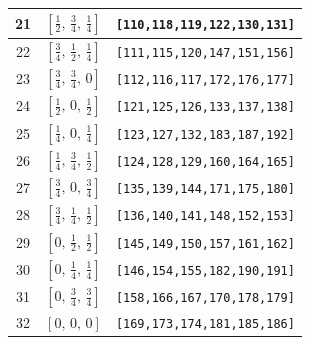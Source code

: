 \documentclass[fleqn,8pt]{jsarticle}
\begin{document}
\begin{longtable}{ccc}
21 & $\left[ \frac{1}{2},\, \frac{3}{4},\, \frac{1}{4} \right]$ & {\tt [110,118,119,122,130,131]} \\ \hline
22 & $\left[ \frac{3}{4},\, \frac{1}{2},\, \frac{1}{4} \right]$ & {\tt [111,115,120,147,151,156]} \\ \hline
23 & $\left[ \frac{3}{4},\, \frac{3}{4},\, 0 \right]$ & {\tt [112,116,117,172,176,177]} \\ \hline
24 & $\left[ \frac{1}{2},\, 0,\, \frac{1}{2} \right]$ & {\tt [121,125,126,133,137,138]} \\ \hline
25 & $\left[ \frac{1}{4},\, 0,\, \frac{1}{4} \right]$ & {\tt [123,127,132,183,187,192]} \\ \hline
26 & $\left[ \frac{1}{4},\, \frac{3}{4},\, \frac{1}{2} \right]$ & {\tt [124,128,129,160,164,165]} \\ \hline
27 & $\left[ \frac{3}{4},\, 0,\, \frac{3}{4} \right]$ & {\tt [135,139,144,171,175,180]} \\ \hline
28 & $\left[ \frac{3}{4},\, \frac{1}{4},\, \frac{1}{2} \right]$ & {\tt [136,140,141,148,152,153]} \\ \hline
29 & $\left[ 0,\, \frac{1}{2},\, \frac{1}{2} \right]$ & {\tt [145,149,150,157,161,162]} \\ \hline
30 & $\left[ 0,\, \frac{1}{4},\, \frac{1}{4} \right]$ & {\tt [146,154,155,182,190,191]} \\ \hline
31 & $\left[ 0,\, \frac{3}{4},\, \frac{3}{4} \right]$ & {\tt [158,166,167,170,178,179]} \\ \hline
32 & $\left[ 0,\, 0,\, 0 \right]$ & {\tt [169,173,174,181,185,186]} \\
\end{longtable}
\renewcommand{\arraystretch}{1.2}
\end{document}
